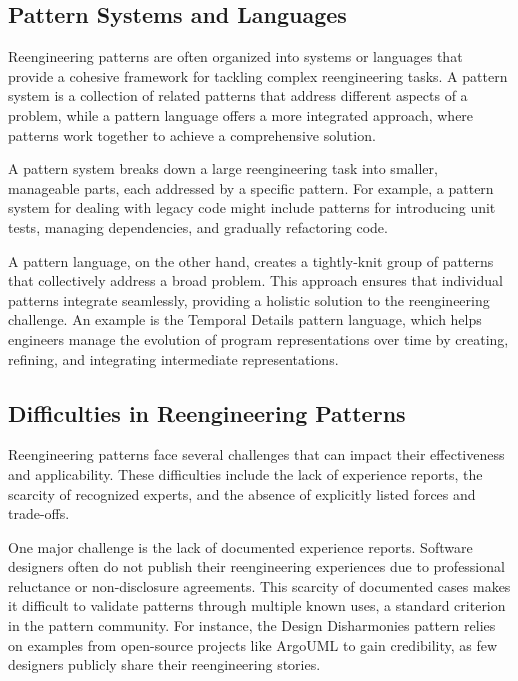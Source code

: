 \subsection{Pattern Systems and Languages}

Reengineering patterns are often organized into systems or languages that provide a cohesive framework for tackling complex reengineering tasks. A pattern system is a collection of related patterns that address different aspects of a problem, while a pattern language offers a more integrated approach, where patterns work together to achieve a comprehensive solution.

A pattern system breaks down a large reengineering task into smaller, manageable parts, each addressed by a specific pattern. For example, a pattern system for dealing with legacy code might include patterns for introducing unit tests, managing dependencies, and gradually refactoring code.

A pattern language, on the other hand, creates a tightly-knit group of patterns that collectively address a broad problem. This approach ensures that individual patterns integrate seamlessly, providing a holistic solution to the reengineering challenge. An example is the Temporal Details pattern language, which helps engineers manage the evolution of program representations over time by creating, refining, and integrating intermediate representations.

\subsection{Difficulties in Reengineering Patterns}

Reengineering patterns face several challenges that can impact their effectiveness and applicability. These difficulties include the lack of experience reports, the scarcity of recognized experts, and the absence of explicitly listed forces and trade-offs.

One major challenge is the lack of documented experience reports. Software designers often do not publish their reengineering experiences due to professional reluctance or non-disclosure agreements. This scarcity of documented cases makes it difficult to validate patterns through multiple known uses, a standard criterion in the pattern community. For instance, the Design Disharmonies pattern relies on examples from open-source projects like ArgoUML to gain credibility, as few designers publicly share their reengineering stories.


